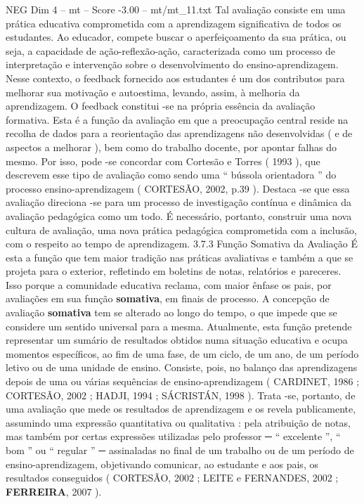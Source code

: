 \begin{textsample}{NEG Dim 4 – mt – Score -3.00 – mt/mt\_11.txt}
Tal avaliação consiste em uma prática educativa comprometida com a aprendizagem significativa de todos os estudantes.
Ao educador, compete buscar o aperfeiçoamento da sua prática, ou seja, a capacidade de ação-reflexão-ação, caracterizada como um processo de interpretação e intervenção sobre o desenvolvimento do ensino-aprendizagem.
Nesse contexto, o feedback fornecido aos estudantes é um dos contributos para melhorar sua motivação e autoestima, levando, assim, à melhoria da aprendizagem.
O feedback constitui -se na própria essência da avaliação formativa.
Esta é a função da avaliação em que a preocupação central reside na recolha de dados para a reorientação das aprendizagens não desenvolvidas ( e de aspectos a melhorar ), bem como do trabalho docente, por apontar falhas do mesmo.
Por isso, pode -se concordar com Cortesão e Torres ( 1993 ), que descrevem esse tipo de avaliação como sendo uma “ bússola orientadora ” do processo ensino-aprendizagem ( CORTESÃO, 2002, p.39 ).
Destaca -se que essa avaliação direciona -se para um processo de investigação contínua e dinâmica da avaliação pedagógica como um todo.
É necessário, portanto, construir uma nova cultura de avaliação, uma nova prática pedagógica comprometida com a inclusão, com o respeito ao tempo de aprendizagem. 3.7.3 Função Somativa da Avaliação É esta a função que tem maior tradição nas práticas avaliativas e também a que se projeta para o exterior, refletindo em boletins de notas, relatórios e pareceres.
Isso porque a comunidade educativa reclama, com maior ênfase os pais, por avaliações em sua função \textbf{somativa}, em finais de processo.
A concepção de avaliação \textbf{somativa} tem se alterado ao longo do tempo, o que impede que se considere um sentido universal para a mesma.
Atualmente, esta função pretende representar um sumário de resultados obtidos numa situação educativa e ocupa momentos específicos, ao fim de uma fase, de um ciclo, de um ano, de um período letivo ou de uma unidade de ensino.
Consiste, pois, no balanço das aprendizagens depois de uma ou várias sequências de ensino-aprendizagem ( CARDINET, 1986 ; CORTESÃO, 2002 ; HADJI, 1994 ; SÁCRISTÁN, 1998 ).
Trata -se, portanto, de uma avaliação que mede os resultados de aprendizagem e os revela publicamente, assumindo uma expressão quantitativa ou qualitativa : pela atribuição de notas, mas também por certas expressões utilizadas pelo professor {\EmojiFont ─} “ excelente ”, “ bom ” ou “ regular ” {\EmojiFont ─} assinaladas no final de um trabalho ou de um período de ensino-aprendizagem, objetivando comunicar, ao estudante e aos pais, os resultados conseguidos ( CORTESÃO, 2002 ; LEITE e FERNANDES, 2002 ; \textbf{FERREIRA}, 2007 ).

\end{textsample}
